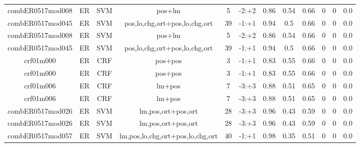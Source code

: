 \documentclass[a4paper]{article}
\begin{document}
\begin{landscape}
\begin{center}
\begin{tabular}{ |c|c|c|c|c|c|c|c|c|c|c|c|}
 
 	
 	\small{ combER0517mod008 } & ER & SVM & pos+lm  &  5 &  -2:+2  &  0.86 & 0.54 & 0.66  &  0 & 0 & 0.0 \\
 	

 
 	
 	\small{ combER0517mod045 } & ER & SVM & pos,lo,chg,ort+pos,lo,chg,ort  &  39 &  -1:+1  &  0.94 & 0.5 & 0.66  &  0 & 0 & 0.0 \\
 	

 
 	
 	\small{ combER0517mod008 } & ER & SVM & pos+lm  &  5 &  -2:+2  &  0.86 & 0.54 & 0.66  &  0 & 0 & 0.0 \\
 	

 
 	
 	\small{ combER0517mod045 } & ER & SVM & pos,lo,chg,ort+pos,lo,chg,ort  &  39 &  -1:+1  &  0.94 & 0.5 & 0.66  &  0 & 0 & 0.0 \\
 	

 
 	
 	\small{ crf01m000 } & ER & CRF & pos+pos  &  3 &  -1:+1  &  0.83 & 0.55 & 0.66  &  0 & 0 & 0.0 \\
 	

 
 	
 	\small{ crf01m000 } & ER & CRF & pos+pos  &  3 &  -1:+1  &  0.83 & 0.55 & 0.66  &  0 & 0 & 0.0 \\
 	

 
 	
 	\small{ crf01m006 } & ER & CRF & lm+pos  &  7 &  -3:+3  &  0.88 & 0.51 & 0.65  &  0 & 0 & 0.0 \\
 	

 
 	
 	\small{ crf01m006 } & ER & CRF & lm+pos  &  7 &  -3:+3  &  0.88 & 0.51 & 0.65  &  0 & 0 & 0.0 \\
 	

 
 	
 	\small{ combER0517mod026 } & ER & SVM & lm,pos,ort+pos,ort  &  28 &  -3:+3  &  0.96 & 0.43 & 0.59  &  0 & 0 & 0.0 \\
 	

 
 	
 	\small{ combER0517mod026 } & ER & SVM & lm,pos,ort+pos,ort  &  28 &  -3:+3  &  0.96 & 0.43 & 0.59  &  0 & 0 & 0.0 \\
 	

 
 	
 	\small{ combER0517mod057 } & ER & SVM & lm,pos,lo,chg,ort+pos,lo,chg,ort  &  40 &  -1:+1  &  0.98 & 0.35 & 0.51  &  0 & 0 & 0.0 \\
 	


\end{tabular}
\end{center}
\end{landscape}
\end{document}
